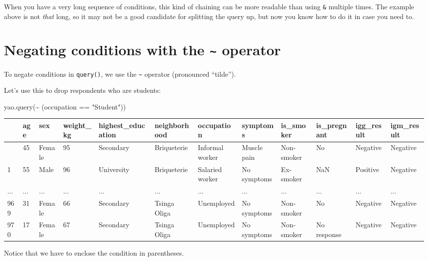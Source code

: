 \documentclass[
  letterpaper,
  DIV=11,
  numbers=noendperiod]{scrreprt}
\newenvironment{Shaded}{\begin{snugshade}}{\end{snugshade}}
\newcommand{\NormalTok}[1]{\textcolor[rgb]{0.00,0.23,0.31}{#1}}
\newcommand{\StringTok}[1]{\textcolor[rgb]{0.13,0.47,0.30}{#1}}
\begin{document}
When you have a very long sequence of conditions, this kind of chaining
can be more readable than using \texttt{\&} multiple times. The example
above is not \emph{that} long, so it may not be a good candidate for
splitting the query up, but now you know how to do it in case you need
to.

\section{\texorpdfstring{Negating conditions with the
\texttt{\textasciitilde{}}
operator}{Negating conditions with the \textasciitilde{} operator}}\label{negating-conditions-with-the-operator}

To negate conditions in \texttt{query()}, we use the
\texttt{\textasciitilde{}} operator (pronounced ``tilde'').

Let's use this to drop respondents who are students:

\begin{Shaded}
\begin{Highlighting}[]
\NormalTok{yao.query(}\StringTok{\textquotesingle{}\textasciitilde{} (occupation == "Student")\textquotesingle{}}\NormalTok{)}
\end{Highlighting}
\end{Shaded}

\begin{longtable}[]{@{}llllllllllll@{}}
\toprule\noalign{}
& age & sex & weight\_kg & highest\_education & neighborhood &
occupation & symptoms & is\_smoker & is\_pregnant & igg\_result &
igm\_result \\
\midrule\noalign{}
\endhead
\bottomrule\noalign{}
\endlastfoot
0 & 45 & Female & 95 & Secondary & Briqueterie & Informal worker &
Muscle pain & Non-smoker & No & Negative & Negative \\
1 & 55 & Male & 96 & University & Briqueterie & Salaried worker & No
symptoms & Ex-smoker & NaN & Positive & Negative \\
... & ... & ... & ... & ... & ... & ... & ... & ... & ... & ... & ... \\
969 & 31 & Female & 66 & Secondary & Tsinga Oliga & Unemployed & No
symptoms & Non-smoker & No & Negative & Negative \\
970 & 17 & Female & 67 & Secondary & Tsinga Oliga & Unemployed & No
symptoms & Non-smoker & No response & Negative & Negative \\
\end{longtable}

Notice that we have to enclose the condition in parentheses.
\end{document}
